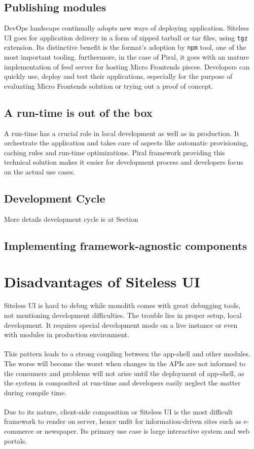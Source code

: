 \documentclass[a4paper]{book}
\begin{document}
\subsection{Publishing modules}
DevOps landscape continually adopts new ways of deploying application. Siteless UI goes for application delivery in a form of zipped tarball or tar files, using \verb|tgz| extension. Its distinctive benefit is the format's adoption by \verb|npm| tool, one of the most important tooling. furthermore, in the case of Piral, it goes with an mature implementation of feed server for hosting Micro Frontends pieces. Developers can quickly use, deploy and test their applications, especially for the purpose of evaluating Micro Frontends solution or trying out a proof of concept.
\subsection{A run-time is out of the box}
A run-time has a crucial role in local development as well as in production. It orchestrate the application and takes care of aspects like automatic provisioning, caching rules and run-time optimizations. Piral framework providing this technical solution makes it easier for development process and developers focus on the actual use cases.

\subsection{Development Cycle}
More details development cycle is at Section \cite{Evaluation of Sample Applications}

\subsection{Implementing framework-agnostic components}

\section{Disadvantages of Siteless UI}

Siteless UI is hard to debug while monolith comes with great debugging tools, not mentioning development difficulties. The trouble lies in proper setup, local development. It requires special development mode on a live instance or even with modules in production environment.
\\ \\ 
This pattern leads to a strong coupling between the app-shell and other modules. The worse will become the worst when changes in the APIs are not informed to the consumers and problems will not arise until the deployment of app-shell, as the system is composited at run-time and developers easily neglect the matter during compile time.
\\ \\
Due to its nature, client-side composition or Siteless UI is the most difficult framework to render on server, hence unfit for information-driven sites such as e-commerce or newspaper. Its primary use case is large interactive system and web portals.
\end{document}
